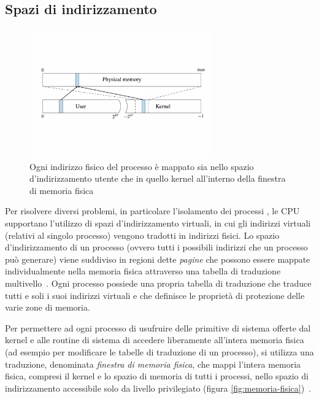 \subsection{Spazi di indirizzamento}
\label{sec:spazi-di-indirizzamento}
\begin{figure}
	\centering
	\includegraphics[width=0.7\textwidth]{"img/memoria-fisica.pdf"}
	\caption{Ogni indirizzo fisico del processo è mappato sia nello spazio d'indirizzamento utente che in quello kernel all'interno della finestra di memoria fisica}
	\label{fig:memoria-fisica}
\end{figure}

Per risolvere diversi problemi, in particolare l'isolamento dei processi \cite{lettieri:paginazione}, le CPU supportano l'utilizzo di spazi d'indirizzamento virtuali, in cui gli indirizzi virtuali (relativi al singolo processo) vengono tradotti in indirizzi fisici. 
Lo spazio d'indirizzamento di un processo (ovvero tutti i possibili indirizzi che un processo può generare) viene suddiviso in regioni dette \emph{pagine} che possono essere mappate individualmente nella memoria fisica attraverso una tabella di traduzione multivello~\cite{lettieri:tabelle-multilivello}. 
Ogni processo possiede una propria tabella di traduzione che traduce tutti e soli i suoi indirizzi virtuali e che definisce le proprietà di protezione delle varie zone di memoria. 

Per permettere ad ogni processo di usufruire delle primitive di sistema offerte dal kernel e alle routine di sistema di accedere liberamente all'intera memoria fisica (ad esempio per modificare le tabelle di traduzione di un processo), si utilizza una traduzione, denominata \emph{finestra di memoria fisica}, che mappi l'intera memoria fisica, compresi il kernel e lo spazio di memoria di tutti i processi, nello spazio di indirizzamento accessibile solo da livello privilegiato (figura \vref{fig:memoria-fisica})~\cite{lettieri:paginazione-complementi}.


